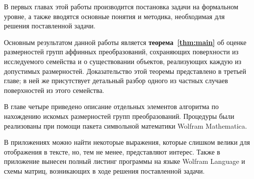 \documentclass[../main.tex]{subfiles}
\begin{document}
В первых главах этой работы производится постановка задачи на формальном уровне, а также вводятся основные понятия и методика, необходимая для решения поставленной задачи.

Основным результатом данной работы является \textbf{теорема~\ref{thm:main}} об оценке размерностей групп аффинных преобразований, сохраняющих поверхности из исследуемого семейства и о существовании объектов, реализующих каждую из допустимых размерностей. Доказательство этой теоремы представлено в третьей главе; в ней же присутствует детальный разбор одного из частных случаев поверхностей из этого семейства.

В главе четыре приведено описание отдельных элементов алгоритма по нахождению искомых размерностей групп преобразований. Процедуры были реализованы при помощи пакета символьной математики {\ttfamily Wolfram Mathematica}.

В приложениях можно найти некоторые выражения, которые слишком велики для отображения в тексте, но, тем не менее, представляют интерес. Также в приложение вынесен полный листинг программы на языке {\ttfamily Wolfram Language} и схемы матриц, возникающих в ходе решения поставленной задачи.
\end{document}
